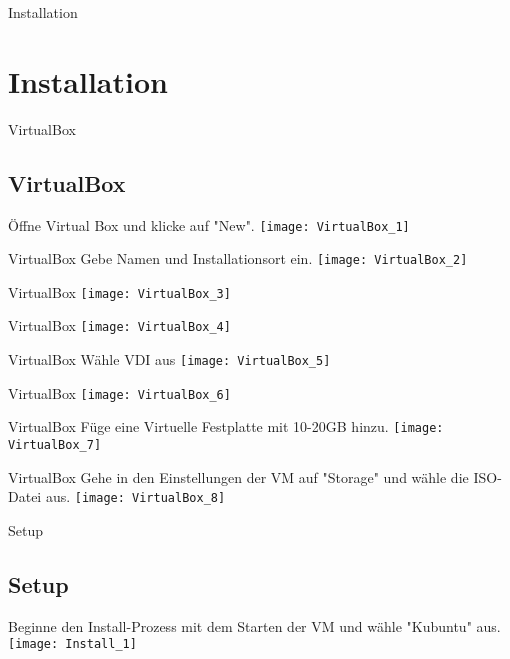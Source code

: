 
\begin{frame}{Installation}
    \section{Installation}\label{sec:installation}
\end{frame}

\begin{frame}{VirtualBox}
    \subsection{VirtualBox}\label{subsec:VirtualBox}
    Öffne Virtual Box und klicke auf "New".
    \texttt{[image: VirtualBox\_1]}
\end{frame}

\begin{frame}{VirtualBox}
    Gebe Namen und Installationsort ein.
    \texttt{[image: VirtualBox\_2]}
\end{frame}

\begin{frame}{VirtualBox}
    \texttt{[image: VirtualBox\_3]}
\end{frame}

\begin{frame}{VirtualBox}
    \texttt{[image: VirtualBox\_4]}
\end{frame}

\begin{frame}{VirtualBox}
    Wähle VDI aus
    \texttt{[image: VirtualBox\_5]}
\end{frame}

\begin{frame}{VirtualBox}
    \texttt{[image: VirtualBox\_6]}
\end{frame}

\begin{frame}{VirtualBox}
    Füge eine Virtuelle Festplatte mit 10-20GB hinzu.
    \texttt{[image: VirtualBox\_7]}
\end{frame}

\begin{frame}{VirtualBox}
    Gehe in den Einstellungen der VM auf "Storage" und wähle die ISO-Datei aus.
    \texttt{[image: VirtualBox\_8]}
\end{frame}

\begin{frame}{Setup}
    \subsection{Setup}\label{subsec:setup}
    Beginne den Install-Prozess mit dem Starten der VM und wähle "Kubuntu" aus.
    \texttt{[image: Install\_1]}
\end{frame}

